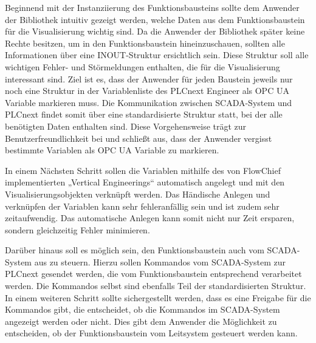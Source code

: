 Beginnend mit der Instanziierung des Funktionsbausteins sollte dem Anwender der Bibliothek intuitiv gezeigt werden, welche Daten aus dem Funktionsbaustein für die Visualisierung wichtig sind. Da die Anwender der Bibliothek später keine Rechte besitzen, um in den Funktionsbaustein hineinzuschauen, sollten alle Informationen über eine INOUT-Struktur ersichtlich sein. Diese Struktur soll alle wichtigen Fehler- und Störmeldungen enthalten, die für die Visualisierung interessant sind. Ziel ist es, dass der Anwender für jeden Baustein jeweils nur noch eine Struktur in der Variablenliste des PLCnext Engineer als OPC UA Variable markieren muss. Die Kommunikation zwischen SCADA-System und PLCnext findet somit über eine standardisierte Struktur statt, bei der alle benötigten Daten enthalten sind. Diese Vorgehensweise trägt zur Benutzerfreundlichkeit bei und schließt aus, dass der Anwender vergisst bestimmte Variablen als OPC UA Variable zu markieren. 

In einem Nächsten Schritt sollen die Variablen mithilfe des von FlowChief implementierten „Vertical Engineerings“ automatisch angelegt und mit den Visualisierungsobjekten verknüpft werden. Das Händische Anlegen und verknüpfen der Variablen kann sehr fehleranfällig sein und ist zudem sehr zeitaufwendig. Das automatische Anlegen kann somit nicht nur Zeit ersparen, sondern gleichzeitig Fehler minimieren.

Darüber hinaus soll es möglich sein, den Funktionsbaustein auch vom SCADA-System aus zu steuern. Hierzu sollen Kommandos vom SCADA-System zur PLCnext gesendet werden, die vom Funktionsbaustein entsprechend verarbeitet werden. Die Kommandos selbst sind ebenfalls Teil der standardisierten Struktur. In einem weiteren Schritt sollte sichergestellt werden, dass es eine Freigabe für die Kommandos gibt, die entscheidet, ob die Kommandos im SCADA-System angezeigt werden oder nicht. Dies gibt dem Anwender die Möglichkeit zu entscheiden, ob der Funktionsbaustein vom Leitsystem gesteuert werden kann.

